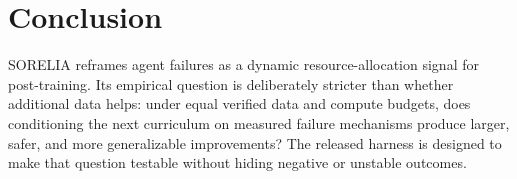 \documentclass{article}
\begin{document}
\section{Conclusion}
SORELIA reframes agent failures as a dynamic resource-allocation signal for post-training. Its empirical question is deliberately stricter than whether additional data helps: under equal verified data and compute budgets, does conditioning the next curriculum on measured failure mechanisms produce larger, safer, and more generalizable improvements? The released harness is designed to make that question testable without hiding negative or unstable outcomes.
\end{document}
